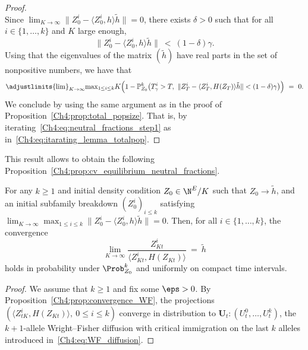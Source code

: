 \begin{refsegment}
\begin{proof}
\[\]
Since $\lim_{K\to\infty}\lVert Z^i_0- \langle Z^{i}_0, h\rangle\tilde h \rVert=0$, there exists $\delta>0$ such that for all $i\in\{1,\ldots, k\}$ and $K$ large enough, 
\[
\lVert Z^i_0 -\langle  Z^i_0, h \rangle\tilde h\rVert\  <\ (1-\delta)\gamma.
\]
Using that the eigenvalues of the matrix
$(\tilde h)$ have real parts in the set of nonpositive numbers, we have that
\begin{equation}\label{Ch4:eq:neutral_fractions_step1}
  \adjustlimits{\lim}_{K\to\infty}{\max}_{1\leq i\leq k} K\Big(1- \mathbb{P}^k_{Z_0}\big(  T^i_\gamma > T,\ \lVert Z^i_T  -\langle  Z^i_T, H(Z_T)\rangle\tilde h\rVert  < (1-\delta)\gamma\big)\Big)\ =\ 0.
\end{equation}
We conclude by using the same argument as in the proof of Proposition~\ref{Ch4:prop:total_popsize}. That is, by iterating~\eqref{Ch4:eq:neutral_fractions_step1} as in~\eqref{Ch4:eq:itarating_lemma_totalpop}.
\end{proof}

This result allows to obtain the following Proposition~\ref{Ch4:prop:cv_equilibrium_neutral_fractions}.
\begin{prop}\label{Ch4:prop:cv_equilibrium_neutral_fractions}
 For any $k\geq 1$ and initial density condition $Z_0\in \N^E/K$ such that
$Z_0 \to\tilde h$, and an initial subfamily breakdown $(Z^i_0)_{i\leq k}$ satisfying  $\lim_{K\to\infty}\max_{1\leq i\leq k}  \lVert Z^i_0 - \langle Z^i_0, h\rangle \tilde h \rVert = 0$.
 Then, for all $i\in \{1,\ldots, k\}$, the convergence
 \[\lim_{K\to\infty} \frac{Z^i_{Kt}}{\langle Z^i_{Kt}, H(Z_{Kt}) \rangle} \ = \ \tilde h\]
  holds in probability under $\Prob^k_{Z_0}$ and uniformly on compact time intervals.
\end{prop}
\begin{proof}
We assume that $k\geq 1$ and fix some $\eps>0$.
By Proposition~\ref{Ch4:prop:convergence_WF}, the projections $(\langle  Z^i_{tK}, H(Z_{Kt}) \rangle,\ 0\leq i\leq k)$ converge in distribution to $\bm U_t: (U^0_t, \ldots, U^k_t)$, the $k+1$-allele Wright--Fisher diffusion with critical immigration on the last $k$ alleles introduced in~\eqref{Ch4:eq:WF_diffusion}.


\end{proof}
\end{refsegment}
